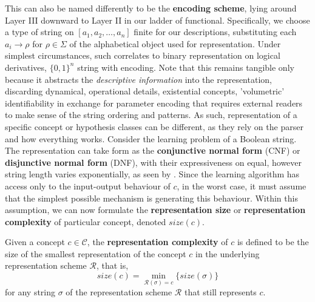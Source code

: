 This can also be named differently to be the \textbf{encoding scheme}, lying around Layer III downward to Layer II in our ladder of functional. Specifically, we choose a type of string on $[a_1,a_2,\dots,a_n]$ finite for our descriptions, substituting each $a_{i}\to \rho$ for $\rho\in\Sigma$ of the alphabetical object used for representation. Under simplest circumstances, such correlates to binary representation on logical derivatives, $\{0,1\}^{n}$ string with encoding. Note that this remains tangible only because it abstracts the \textit{descriptive information} into the representation, discarding dynamical, operational details, existential concepts, 'volumetric' identifiability in exchange for parameter encoding that requires external readers to make sense of the string ordering and patterns. 
As such, representation of a specific concept or hypothesis classes can be different, as they rely on the parser and how everything works. Consider the learning problem of a Boolean string. The representation can take form as the \textbf{conjunctive normal form} (CNF) or \textbf{disjunctive normal form} (DNF), with their expressiveness on equal, however string length varies exponentially, as seen by \cite{Wegener1987,MiltersenRadhakrishnanWegener2005,DarwicheMarquis2002}. Since the learning algorithm has access only to the input-output behaviour of $c$, in the worst case, it must assume that the simplest possible mechanism is generating this behaviour. Within this assumption, we can now formulate the \textbf{representation size} or \textbf{representation complexity} of particular concept, denoted $size(c)$. 
\begin{definition}
    Given a concept $c\in\mathcal{C}$, the \textbf{representation complexity} of $c$ is defined to be the size of the smallest representation of the concept $c$ in the underlying representation scheme $\mathcal{R}$, that is, 
    \begin{equation*}
    size(c) = \min_{\mathcal{R}(\sigma)=c}\{size(\sigma)\}
\end{equation*}
for any string $\sigma$ of the representation scheme $\mathcal{R}$ that still represents $c$.
\end{definition}

